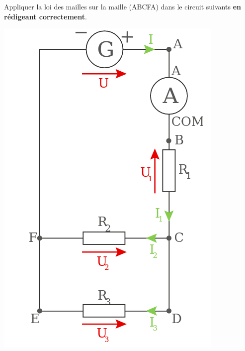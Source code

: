 \documentclass[11pt]{exam}		%
\begin{document}
\begin{questions}
\begin{minipage}[c]{0.6\textwidth}
		\question[2] Appliquer la loi des mailles sur la maille (ABCFA) dans le circuit suivants \textbf{en rédigeant correctement}.

	\end{minipage}
	\hspace{0.05\textwidth}
	\begin{minipage}[c]{0.2\textwidth}
		\includegraphics[scale=0.4]{c1.png}
	\end{minipage}
\end{questions}


\clearpage


\countpoint
\end{document}
